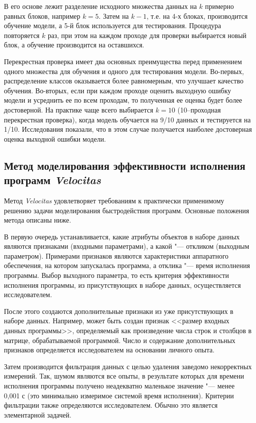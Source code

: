 В его основе лежит разделение исходного множества данных на $k$ примерно равных блоков, например $k = 5$. Затем на $k - 1$, т.е. на 4-х блоках, производится обучение модели, а 5-й блок используется для тестирования. Процедура повторяется $k$ раз, при этом на каждом проходе для проверки выбирается новый блок, а обучение производится на оставшихся.

Перекрестная проверка имеет два основных преимущества перед применением одного множества для обучения и одного для тестирования модели. Во-первых, распределение классов оказывается более равномерным, что улучшает качество обучения. Во-вторых, если при каждом проходе оценить выходную ошибку модели и усреднить ее по всем проходам, то полученная ее оценка будет более достоверной. На практике чаще всего выбирается $k = 10$ (10--проходная перекрестная проверка), когда модель обучается на 9/10 данных и тестируется на 1/10. Исследования показали, что в этом случае получается наиболее достоверная оценка выходной ошибки модели.


\subsection{Метод моделирования эффективности исполнения программ \textit{Velocitas}}
Метод \textit{Velocitas} удовлетворяет требованиям к практически применимому решению задачи моделирования быстродействия программ. Основные положения метода описаны ниже.

В первую очередь устанавливается, какие атрибуты объектов в наборе данных являются признаками (входными параметрами), а какой "--- откликом (выходным параметром). Примерами признаков являются характеристики аппаратного обеспечения, на котором запускалась программа, а отклика "--- время исполнения программы. Выбор выходного параметра, то есть критерия эффективности исполнения программы, из присутствующих в наборе данных, осуществляется исследователем.

После этого создаются дополнительные признаки из уже присутствующих в наборе данных. Например, может быть создан признак <<размер входных данных программы>>, определяемый как произведение числа строк и столбцов в матрице, обрабатываемой программой. Число и содержание дополнительных признаков определяется исследователем на основании личного опыта.

Затем производится фильтрация данных с целью удаления заведомо некорректных измерений. Так, шумом являются все опыты, в результате которых для времени исполнения программы получено неадекватно маленькое значение "--- менее 0,001 с (это минимально измеримое системой время исполнения). Критерии фильтрации также определяются исследователем. Обычно это является элементарной задачей.

